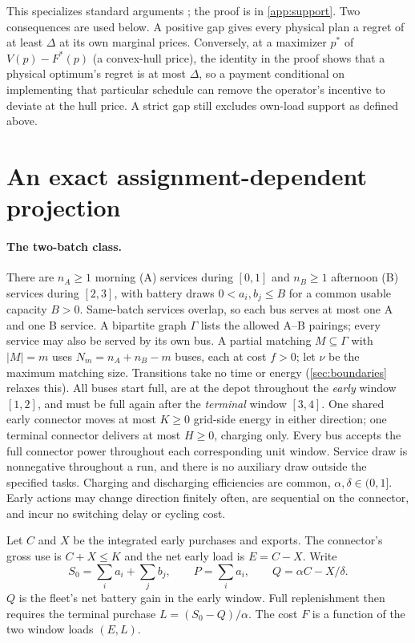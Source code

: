 \documentclass[11pt]{article}
\theoremstyle{definition}\newtheorem{definition}[theorem]{Definition}
\theoremstyle{remark}\newtheorem{remark}[theorem]{Remark}
\begin{document}
This specializes standard arguments \citep{oneill2005,gribikHoganPope2007,huaBaldick2017};
the proof is in \cref{app:support}. Two consequences are used below. A positive
gap gives every physical plan a regret of at least $\Delta$ at its own marginal
prices. Conversely, at a maximizer $p^*$ of $V(p)-F^*(p)$ (a convex-hull price), the
identity in the proof shows that a physical optimum's regret is at most $\Delta$,
so a payment conditional on implementing that particular schedule can remove
the operator's incentive to deviate at the hull price. A strict gap still
excludes own-load support as defined above.

\section{An exact assignment-dependent projection}\label{sec:projection}

\paragraph{The two-batch class.}
There are $n_A\ge1$ morning (A) services during $[0,1]$ and $n_B\ge1$ afternoon
(B) services during $[2,3]$, with battery draws $0<a_i,b_j\le B$ for a common
usable capacity $B>0$. Same-batch services overlap, so each bus serves at most
one A and one B service. A bipartite graph $\Gamma$ lists the allowed A--B
pairings; every service may also be served by its own bus. A partial matching
$M\subseteq\Gamma$ with $|M|=m$ uses $N_m=n_A+n_B-m$ buses, each at cost $f>0$;
let $\nu$ be the maximum matching size. Transitions take no time or energy
(\cref{sec:boundaries} relaxes this). All buses start full, are at the depot
throughout the \emph{early} window $[1,2]$, and must be full again after the
\emph{terminal} window $[3,4]$. One shared early connector moves at most $K\ge0$
grid-side energy in either direction; one terminal connector delivers at most
$H\ge0$, charging only. Every bus accepts the full connector power throughout
each corresponding unit window. Service draw is nonnegative throughout a
run, and there is no auxiliary draw outside the specified tasks.
Charging and discharging efficiencies are common,
$\alpha,\delta\in(0,1]$. Early actions may change direction finitely often, are
sequential on the connector, and incur no switching delay or cycling cost.

Let $C$ and $X$ be the integrated early purchases and exports. The connector's
gross use is $C+X\le K$ and the net early load is $E=C-X$. Write
\[
 S_0=\sum_i a_i+\sum_j b_j,\qquad P=\sum_i a_i,\qquad Q=\alpha C-X/\delta.
\]
$Q$ is the fleet's net battery gain in the early window. Full replenishment then
requires the terminal purchase $L=(S_0-Q)/\alpha$. The cost $F$ is a function of
the two window loads $(E,L)$.
\end{document}
